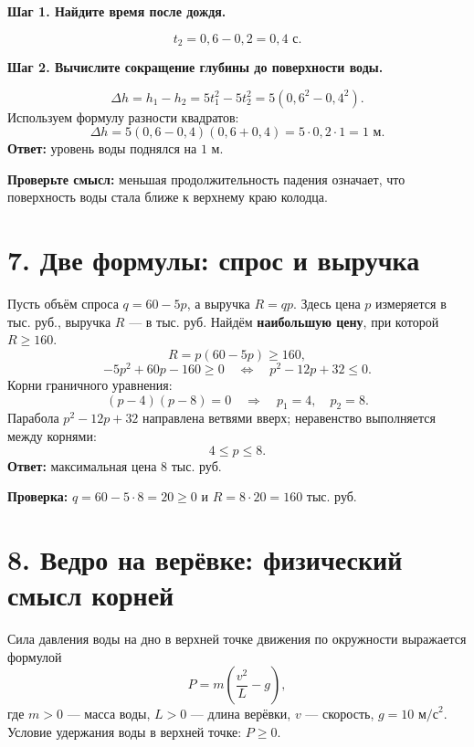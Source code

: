 \documentclass[a4paper,11pt]{article}
\newcommand{\key}[1]{\textcolor{darkaccent}{\textbf{#1}}}
\newcommand{\ex}[1]{\par\smallskip\textbf{\textcolor{accent}{#1}}\par}
\begin{document}
\begin{center}
\end{center}

\ex{Шаг 1. Найдите время после дождя.}
\[
t_2=0{,}6-0{,}2=0{,}4\text{ с}.
\]

\ex{Шаг 2. Вычислите сокращение глубины до поверхности воды.}
\[
\Delta h=h_1-h_2=5t_1^2-5t_2^2
=5(0{,}6^2-0{,}4^2).
\]
Используем формулу разности квадратов:
\[
\Delta h=5(0{,}6-0{,}4)(0{,}6+0{,}4)
=5\cdot0{,}2\cdot1=1\text{ м}.
\]
\key{Ответ:} уровень воды поднялся на \(1\) м.

\textbf{Проверьте смысл:} меньшая продолжительность падения означает,
что поверхность воды стала ближе к верхнему краю колодца.

\section*{7. Две формулы: спрос и выручка}

Пусть объём спроса \(q=60-5p\), а выручка \(R=qp\).
Здесь цена \(p\) измеряется в тыс. руб., выручка \(R\) --- в тыс. руб.
Найдём \textbf{наибольшую цену}, при которой \(R\ge160\).
\[
R=p(60-5p)\ge160,
\]
\[
-5p^2+60p-160\ge0
\quad\Longleftrightarrow\quad
p^2-12p+32\le0.
\]
Корни граничного уравнения:
\[
(p-4)(p-8)=0
\quad\Longrightarrow\quad p_1=4,\quad p_2=8.
\]
Парабола \(p^2-12p+32\) направлена ветвями вверх;
неравенство выполняется между корнями:
\[
4\le p\le8.
\]
\key{Ответ:} максимальная цена \(8\) тыс. руб.

\textbf{Проверка:} \(q=60-5\cdot8=20\ge0\) и
\(R=8\cdot20=160\) тыс. руб.

\section*{8. Ведро на верёвке: физический смысл корней}

Сила давления воды на дно в верхней точке движения по окружности
выражается формулой
\[
P=m\left(\frac{v^2}{L}-g\right),
\]
где \(m>0\) --- масса воды, \(L>0\) --- длина верёвки,
\(v\) --- скорость, \(g=10\text{ м/с}^2\).
Условие удержания воды в верхней точке: \(P\ge0\).
\end{document}
